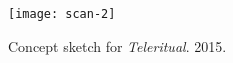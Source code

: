 \documentclass[a4paper,nobib]{tufte-handout}
\begin{document}
\begin{figure}
    \texttt{[image: scan-2]}
    \caption{Concept sketch for \emph{Teleritual}. 2015.}
    \label{fig:sketch1}
\end{figure}
\printbibliography
\end{document}
